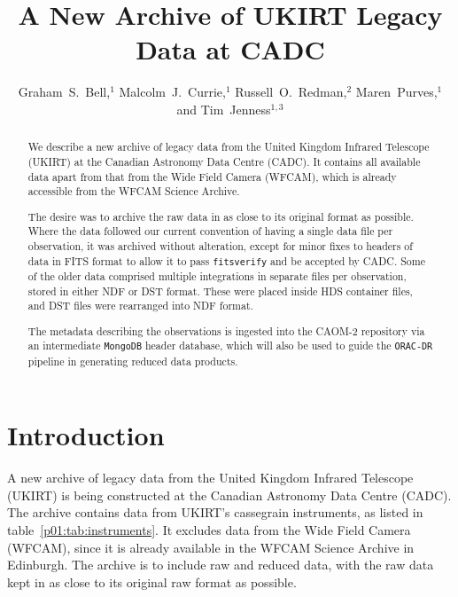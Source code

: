 \documentclass[11pt,twoside]{article}
\begin{document}
\title{A New Archive of UKIRT Legacy Data at CADC}
\author{Graham~S.~Bell,$^1$ Malcolm~J.~Currie,$^1$ Russell~O.~Redman,$^2$ Maren~Purves,$^1$ and Tim~Jenness$^{1,3}$
}

\begin{abstract}
We describe a  new archive of legacy data from the United Kingdom Infrared
Telescope (UKIRT) at the Canadian Astronomy
Data Centre (CADC).  It contains all available data apart from
that from the Wide Field Camera (WFCAM), which is already
accessible from the WFCAM Science Archive.

The desire was to archive the raw data in as close to its original
format as possible.  Where the data followed our current convention
of having a single data file per observation, it was archived
without alteration, except for minor fixes to headers of data in
FITS format to allow it to pass \texttt{fitsverify} and be accepted by CADC.
Some of the older data comprised multiple integrations in separate
files per observation, stored in either NDF or DST format. These
were placed inside HDS container files, and DST files were rearranged
into NDF format.

The metadata describing the observations is
ingested into the CAOM-2 repository via an
intermediate \texttt{MongoDB} header database, which will
also be used to guide the \texttt{ORAC-DR} pipeline
in generating reduced data products.
\end{abstract}

\section{Introduction}

A new archive of legacy data from the United Kingdom Infrared
Telescope (UKIRT) is being constructed at the Canadian Astronomy
Data Centre (CADC).
The archive contains data from UKIRT's cassegrain instruments,
as listed in table~\ref{p01:tab:instruments}.
It excludes data from the Wide Field Camera (WFCAM),
since it is already available in the WFCAM Science Archive
\citep{2008MNRAS.384..637H}
in Edinburgh.
The archive is to include raw and reduced data,
with the raw data
kept in as close to its original raw format as possible.
\end{document}
